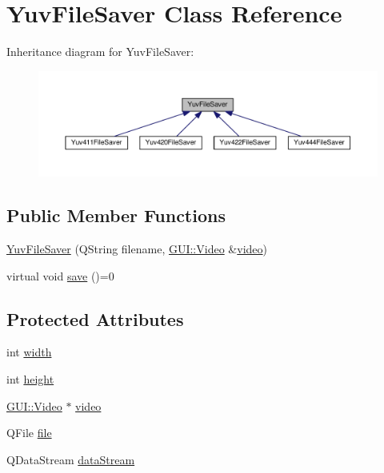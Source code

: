 \hypertarget{classUtility_1_1YuvFileSaver}{}\section{Yuv\+File\+Saver Class Reference}
\label{classUtility_1_1YuvFileSaver}


Inheritance diagram for Yuv\+File\+Saver\+:
\nopagebreak
\begin{figure}[H]
\begin{center}
\leavevmode
\includegraphics[width=350pt]{classUtility_1_1YuvFileSaver__inherit__graph}
\end{center}
\end{figure}
\subsection*{Public Member Functions}
\begin{DoxyCompactItemize}
\item 
\hyperlink{classUtility_1_1YuvFileSaver_a79039c7ffaef605837eef5f4d7554ac1}{Yuv\+File\+Saver} (Q\+String filename, \hyperlink{classGUI_1_1Video}{G\+U\+I\+::\+Video} \&\hyperlink{classUtility_1_1YuvFileSaver_a1c4d4daa00ecea5e8390244e057da0df}{video})
\item 
virtual void \hyperlink{classUtility_1_1YuvFileSaver_a710cb29afe2cd3d97a312f61140af200}{save} ()=0
\end{DoxyCompactItemize}
\subsection*{Protected Attributes}
\begin{DoxyCompactItemize}
\item 
int \hyperlink{classUtility_1_1YuvFileSaver_a2474a5474cbff19523a51eb1de01cda4}{width}
\item 
int \hyperlink{classUtility_1_1YuvFileSaver_ad12fc34ce789bce6c8a05d8a17138534}{height}
\item 
\hyperlink{classGUI_1_1Video}{G\+U\+I\+::\+Video} $\ast$ \hyperlink{classUtility_1_1YuvFileSaver_a1c4d4daa00ecea5e8390244e057da0df}{video}
\item 
Q\+File \hyperlink{classUtility_1_1YuvFileSaver_a74a949f8555712ca2e528cf69d0d7f68}{file}
\item 
Q\+Data\+Stream \hyperlink{classUtility_1_1YuvFileSaver_a76868f3c583ad31447f724a6dcce0a8a}{data\+Stream}
\end{DoxyCompactItemize}



